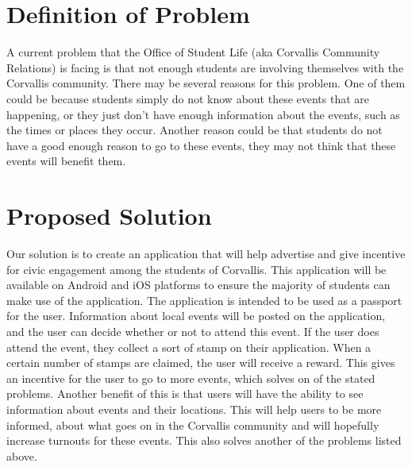 \documentclass[onecolumn, draftclsnofoot,10pt, compsoc]{IEEEtran}
\begin{document}
\section{Definition of Problem}

A current problem that the Office of Student Life (aka Corvallis Community Relations) is facing is that not enough
students are involving themselves with the Corvallis community. There may be several reasons for this problem.
One of them could be because students simply do not know about these events that are happening, or they just don't
have enough information about the events, such as the times or places they occur. Another reason could be that
students do not have a good enough reason to go to these events, they may not think that these events will benefit them.

\section{Proposed Solution}
Our solution is to create an application that will help advertise and give incentive for civic engagement among the
students of Corvallis. This application will be available on Android and iOS platforms to ensure the majority of students can make use of the application.
The application is intended to be used as a passport for the user. Information about local events will be posted on the application,
and the user can decide whether or not to attend this event. If the user does attend the event, they collect a
sort of stamp on their application. When a certain number of stamps are claimed, the user will receive a reward. This gives an incentive for the user to go to more events, which solves on of the stated problems.
Another benefit of this is that users will have the ability to see information about events and their locations. This will help users to be more informed,
about what goes on in the Corvallis community and will hopefully increase turnouts for these events. This also solves another of the problems
listed above.
\end{document}
